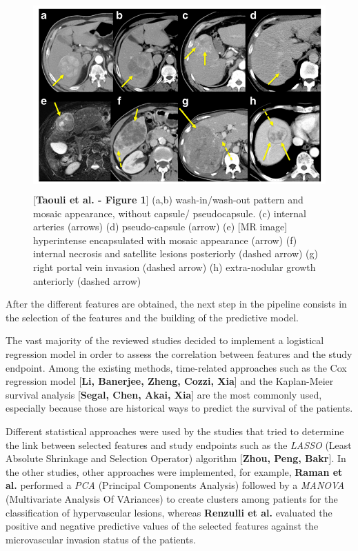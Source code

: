\documentclass[]{article}
\begin{document}
\begin{figure}[ht!]
\centering
\includegraphics[width=4.67498in,height=2.86979in]{./images/image8.png}
\caption{{[}\textbf{Taouli et al. - Figure 1}{]}
(a,b) wash-in/wash-out pattern and mosaic appearance, without capsule/
pseudocapsule.
(c) internal arteries (arrows)
(d) pseudo-capsule (arrow)
(e) {[}MR image{]} hyperintense encapsulated with mosaic appearance
(arrow)
(f) internal necrosis and satellite lesions posteriorly (dashed arrow)
(g) right portal vein invasion (dashed arrow)
(h) extra-nodular growth anteriorly (dashed arrow)
}
\end{figure}


After the different features are obtained, the next step in the pipeline
consists in the selection of the features and the building of the
predictive model.

The vast majority of the reviewed studies decided to implement a
logistical regression model in order to assess the correlation between
features and the study endpoint. Among the existing methods,
time-related approaches such as the Cox regression model {[}\textbf{Li,
Banerjee, Zheng, Cozzi, Xia}{]} and the Kaplan-Meier survival analysis
{[}\textbf{Segal, Chen, Akai, Xia}{]} are the most commonly used,
especially because those are historical ways to predict the survival of
the patients.

Different statistical approaches were used by the studies that tried to
determine the link between selected features and study endpoints such as
the \emph{LASSO} (Least Absolute Shrinkage and Selection Operator)
algorithm {[}\textbf{Zhou, Peng, Bakr}{]}. In the other studies, other
approaches were implemented, for example, \textbf{Raman et al.}
performed a \emph{PCA} (Principal Components Analysis) followed by a
\emph{MANOVA} (Multivariate Analysis Of VAriances) to create clusters
among patients for the classification of hypervascular lesions, whereas
\textbf{Renzulli et al.} evaluated the positive and negative predictive
values of the selected features against the microvascular invasion
status of the patients.
\end{document}
